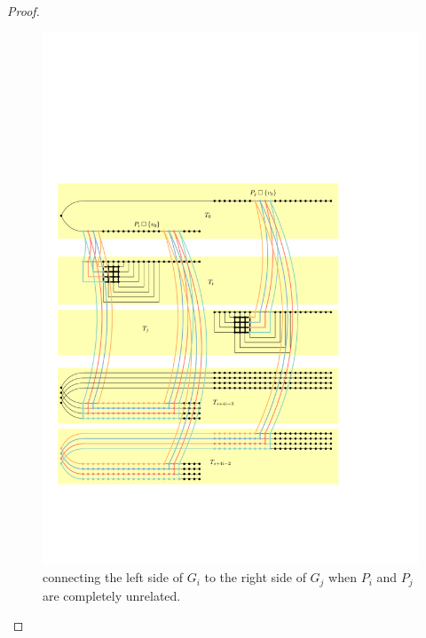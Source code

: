 \documentclass[kpfonts,lotsofwhite]{patmorin}
\theoremstyle{plain}
\theoremstyle{definition}
\begin{document}
\begin{proof}
\begin{itemize}
    \begin{figure}
      \begin{center}
        \includegraphics{figs/reverso}
      \end{center}
      \caption{connecting the left side of $G_i$ to the right side of $G_j$ when $P_i$ and $P_j$ are completely unrelated.}
      \label{reverso}
    \end{figure}

  \end{itemize}





\end{proof}
\end{document}
